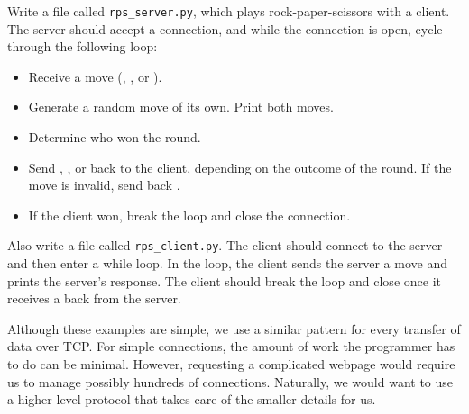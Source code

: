 \begin{problem} %
Write a file called \texttt{rps\_server.py}, which plays rock-paper-scissors with a client.
The server should accept a connection, and while the connection is open, cycle through the following loop:
\begin{itemize}
	\item Receive a move (, , or ).
	\item Generate a random move of its own. Print both moves.
	\item Determine who won the round.
	\item Send , , or  back to the client, depending on the outcome of the round.
    If the move is invalid, send back .
	\item If the client won, break the loop and close the connection.
\end{itemize}

Also write a file called \texttt{rps\_client.py}.
The client should connect to the server and then enter a while loop.
In the loop, the client sends the server a move and prints the server's response.
The client should break the loop and close once it receives a  back from the server.
\end{problem}

Although these examples are simple, we use a similar pattern for every transfer of data over TCP.
For simple connections, the amount of work the programmer has to do can be minimal.
However, requesting a complicated webpage would require us to manage possibly hundreds of connections.
Naturally, we would want to use a higher level protocol that takes care of the smaller details for us.

\begin{comment}
While we would normally think of communication between sockets on different machines, two sockets on the same machine can communicate via TCP as well.
We give an example of the latter, for simplicity.





We can start understanding the code above by seeing that a TCP connection is a link between two sockets.
Those sockets can be on the same machine (as in the case above), or different machines.
The machines are uniquely identified by an IP address.
The IP address used in our example is a special IP address that always refers the local machine.
Every computer has the ip 127.0.0.1.
\end{comment}

